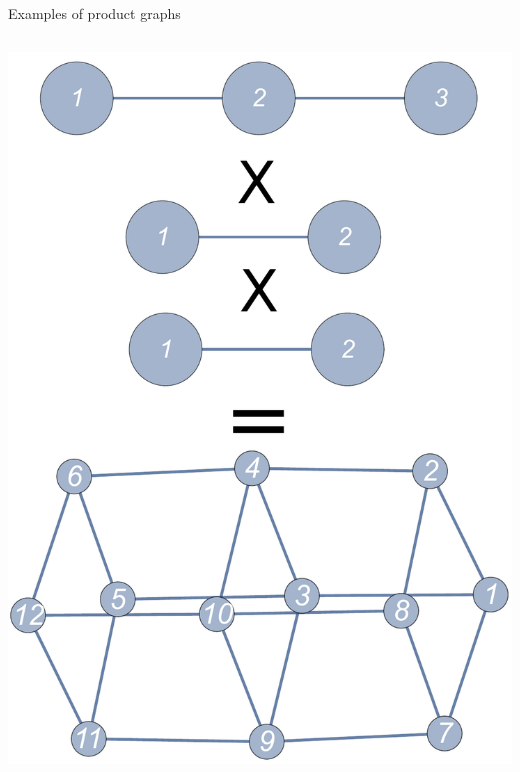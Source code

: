 {\begin{frame}{Examples of product graphs}
\begin{columns}[T]
{\begin{column}{0.33\textwidth}
    		\includegraphics[trim=0 0 0 -10mm, width=\textwidth]{Images/graphprod_chain3_chain2_square}
		\end{column}}
\end{columns}
\end{frame}}
